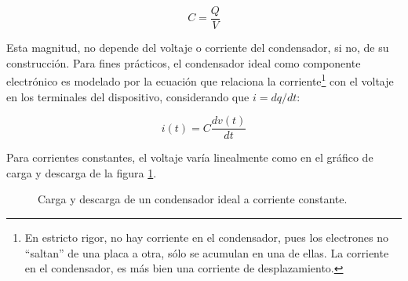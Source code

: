 \begin{equation}
	C = \frac{Q}{V}
\end{equation}

Esta magnitud, no depende del voltaje o corriente del condensador, si no, de su construcción. Para fines prácticos, el condensador ideal como componente electrónico es modelado por la ecuación que relaciona la corriente\footnote{En estricto rigor, no hay corriente en el condensador, pues los electrones no ``saltan'' de una placa a otra, sólo se acumulan en una de ellas. La corriente en el condensador, es más bien una corriente de desplazamiento.} con el voltaje en los terminales del dispositivo, considerando que $i = dq/dt$:

\begin{equation}
	i(t) = C \frac{dv(t)}{dt}
\end{equation}

Para corrientes constantes, el voltaje varía linealmente como en el gráfico de carga y descarga de la figura \ref{fig:plot:charge-discharge_ideal_cap}.

\begin{figure}
	\caption{Carga y descarga de un condensador ideal a corriente constante.}
	\label{fig:plot:charge-discharge_ideal_cap}
\end{figure}

